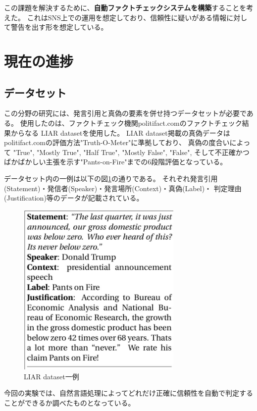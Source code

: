 \documentclass[twocolumn, a4paper, uplatex]{UECIEresume}
\begin{document}
この課題を解決するために、\textbf{自動ファクトチェックシステムを構築}することを考えた。
これはSNS上での運用を想定しており、信頼性に疑いがある情報に対して警告を出す形を想定している。

\section{現在の進捗}
\subsection{データセット}
この分野の研究には、発言引用と真偽の要素を併せ持つデータセットが必要である。
使用したのは、ファクトチェック機関politifact.comのファクトチェック結果からなる
LIAR datasetを使用した\cite{pants}。
LIAR dataset掲載の真偽データはpolitifact.comの評価方法"Truth-O-Meter"に準拠\cite{pants}しており、
真偽の度合いによって
"True", "Mostly True", "Half True", "Mostly False", "False",
そして不正確かつばかばかしい主張を示す"Pants-on-Fire"までの6段階評価となっている\cite{truth}。

データセット内の一例は以下の図\ref{fig:liar}の通りである。
それぞれ発言引用(Statement)・発信者(Speaker)・発言場所(Context)・真偽(Label)・
判定理由(Justification)等のデータが記載されている。

\begin{figure}[h]
  \begin{center}
    \includegraphics[width=8cm]{fig_liar.jpg}
    \caption{LIAR dataset一例}
    \label{fig:liar}
  \end{center}
\end{figure}

今回の実験では、自然言語処理によってどれだけ正確に信頼性を自動で判定することができるか調べたものとなっている。
\end{document}
